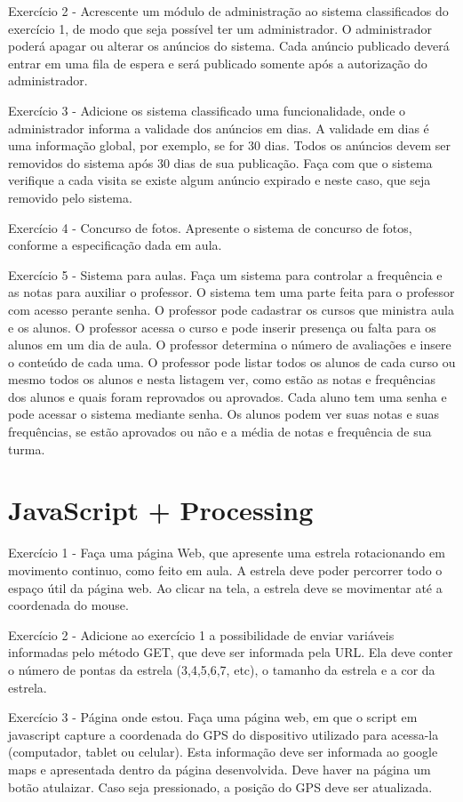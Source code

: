 \documentclass[11pt]{amsart}
\begin{document}
Exercício 2 - Acrescente um módulo de administração ao sistema classificados do exercício 1, de modo que seja possível ter um administrador. O administrador poderá apagar ou alterar os anúncios do sistema. Cada anúncio publicado deverá entrar em uma fila de espera e será publicado somente após a autorização do administrador. 

Exercício 3 - Adicione os sistema classificado uma funcionalidade, onde o administrador informa a validade dos anúncios em dias. A validade em dias é uma informação global, por exemplo, se for 30 dias. Todos os anúncios devem ser removidos do sistema após 30 dias de sua publicação. Faça com que o sistema verifique a cada visita se existe algum anúncio expirado e neste caso, que seja removido pelo sistema.  

Exercício 4 - Concurso de fotos. Apresente o sistema de concurso de fotos, conforme a especificação dada em aula. 

Exercício 5 - Sistema para aulas. Faça um sistema para controlar a frequência e as notas para auxiliar o professor. O sistema tem uma parte feita para o professor com acesso perante senha. O professor pode cadastrar os cursos que ministra aula e os alunos. O professor acessa o curso e pode inserir presença ou falta para os alunos em um dia de aula. O professor determina o número de avaliações e insere o conteúdo de cada uma. O professor pode listar todos os alunos de cada curso ou mesmo todos os alunos e nesta listagem ver, como estão as notas e frequências dos alunos e quais foram reprovados ou aprovados. 
Cada aluno tem uma senha e pode acessar o sistema mediante senha. Os alunos podem ver suas notas e suas frequências, se estão aprovados ou não e a média de notas e frequência de sua turma. 

\section{JavaScript + Processing}
Exercício 1 - Faça uma página Web, que apresente uma estrela rotacionando em movimento continuo, como feito em aula. 
A estrela deve poder percorrer todo o espaço útil da página web.
Ao clicar na tela, a estrela deve se movimentar até a coordenada do mouse. 

Exercício 2 - Adicione ao exercício 1 a possibilidade de enviar variáveis informadas pelo método GET, que deve ser informada pela URL. Ela deve conter o número de pontas da estrela (3,4,5,6,7, etc), o tamanho da estrela e a cor da estrela. 

Exercício 3 - Página onde estou. Faça uma página web, em que o script em javascript capture a coordenada do GPS do dispositivo utilizado para acessa-la (computador, tablet ou celular). Esta informação deve ser informada ao google maps e apresentada dentro da página desenvolvida. Deve haver na página um botão atulaizar. Caso seja pressionado, a posição do GPS deve ser atualizada. 
\end{document}
